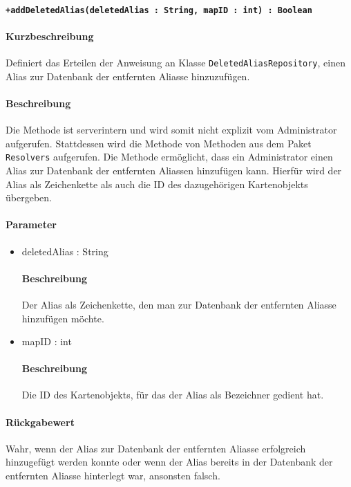\paragraph*{\texttt{+addDeletedAlias(deletedAlias : String, mapID : int) : Boolean}}%
\paragraph*{Kurzbeschreibung}
Definiert das Erteilen der Anweisung an Klasse \texttt{DeletedAliasRepository}, einen Alias zur Datenbank der entfernten Aliasse hinzuzufügen.
\paragraph*{Beschreibung}
Die Methode ist serverintern und wird somit nicht explizit vom Administrator aufgerufen.
Stattdessen wird die Methode von Methoden aus dem Paket \texttt{Resolvers} aufgerufen.
Die Methode ermöglicht, dass ein Administrator einen Alias zur Datenbank der entfernten Aliassen hinzufügen kann.
Hierfür wird der Alias als Zeichenkette als auch die ID des dazugehörigen Kartenobjekts übergeben.
\paragraph*{Parameter}
\begin{itemize}
    \item deletedAlias : String
    		\paragraph*{Beschreibung}
    		Der Alias als Zeichenkette, den man zur Datenbank der entfernten Aliasse hinzufügen möchte.
    \item mapID : int
    		\paragraph*{Beschreibung}
    		Die ID des Kartenobjekts, für das der Alias als Bezeichner gedient hat.
\end{itemize}
\paragraph*{Rückgabewert}
Wahr, wenn der Alias zur Datenbank der entfernten Aliasse erfolgreich hinzugefügt werden konnte oder wenn der Alias bereits in der Datenbank der entfernten Aliasse hinterlegt war, ansonsten falsch.

